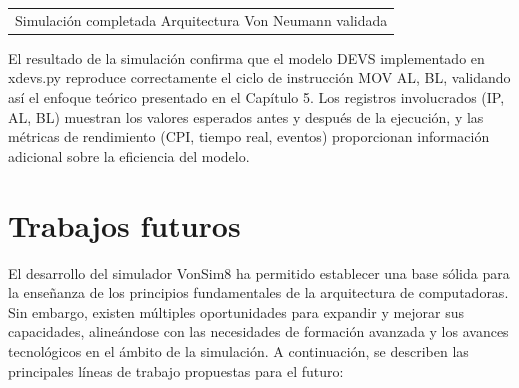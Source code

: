 \documentclass[12pt,oneside]{templates/unerthesis}
\begin{document}
\begin{longtable}[]{@{}l@{}}
\toprule\noalign{}
\endhead
\bottomrule\noalign{}
\endlastfoot
Simulación completada Arquitectura Von Neumann validada \\
\end{longtable}

El resultado de la simulación confirma que el modelo DEVS implementado en xdevs.py reproduce correctamente el ciclo de instrucción MOV AL, BL, validando así el enfoque teórico presentado en el Capítulo 5. Los registros involucrados (IP, AL, BL) muestran los valores esperados antes y después de la ejecución, y las métricas de rendimiento (CPI, tiempo real, eventos) proporcionan información adicional sobre la eficiencia del modelo.

\hypertarget{futuro}{%
\chapter{Trabajos futuros}\label{futuro}}

El desarrollo del simulador VonSim8 ha permitido establecer una base sólida para la enseñanza de los principios fundamentales de la arquitectura de computadoras. Sin embargo, existen múltiples oportunidades para expandir y mejorar sus capacidades, alineándose con las necesidades de formación avanzada y los avances tecnológicos en el ámbito de la simulación. A continuación, se describen las principales líneas de trabajo propuestas para el futuro:
\end{document}
